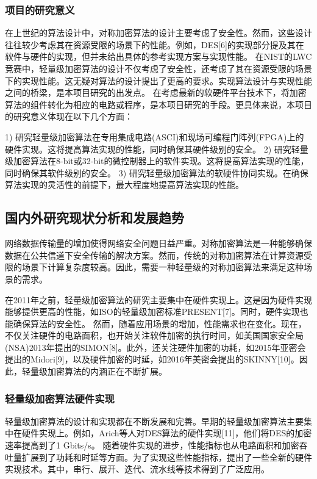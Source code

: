 \documentclass{ctexart}
\begin{document}
\subsubsection{项目的研究意义}
在上世纪的算法设计中，对称加密算法的设计主要考虑了安全性。然而，这些设计往往较少考虑其在资源受限的场景下的性能。例如，DES[6]的实现部分提及其在软件与硬件的实现，但并未给出具体的参考实现方案与实现性能。
在NIST的LWC竞赛中，轻量级加密算法的设计不仅考虑了安全性，还考虑了其在资源受限的场景下的实现性能。这无疑对算法的设计提出了更高的要求。实现算法设计与实现性能之间的桥梁，是本项目研究的出发点。
在考虑最新的软硬件平台技术下，将加密算法的组件转化为相应的电路或程序，是本项目研究的手段。更具体来说，本项目的研究意义体现在以下几个方面：

1) 研究轻量级加密算法在专用集成电路(ASCI)和现场可编程门阵列(FPGA)上的硬件实现。这将提高算法实现的性能，同时确保其硬件级别的安全。
2) 研究轻量级加密算法在8-bit或32-bit的微控制器上的软件实现。这将提高算法实现的性能，同时确保其软件级别的安全。
3) 研究轻量级加密算法的软硬件协同实现。在确保算法实现的灵活性的前提下，最大程度地提高算法实现的性能。


\subsection{国内外研究现状分析和发展趋势}

网络数据传输量的增加使得网络安全问题日益严重。对称加密算法是一种能够确保数据在公共信道下安全传输的解决方案。然而，传统的对称加密算法在计算资源受限的场景下计算复杂度较高。因此，需要一种轻量级的对称加密算法来满足这种场景的需求。

在2011年之前，轻量级加密算法的研究主要集中在硬件实现上。这是因为硬件实现能够提供更高的性能，如ISO的轻量级加密标准PRESENT[7]。同时，硬件实现也能确保算法的安全性。
然而，随着应用场景的增加，性能需求也在变化。现在，不仅关注硬件的电路面积，也开始关注软件加密的执行时间，如美国国家安全局(NSA)2013年提出的SIMON[8]。此外，还关注硬件加密的功耗，如2015年亚密会提出的Midori[9]，以及硬件加密的时延，如2016年美密会提出的SKINNY[10]。因此，轻量级加密算法的内涵正在不断扩展。
\subsubsection{轻量级加密算法硬件实现}
轻量级加密算法的设计和实现都在不断发展和完善。早期的轻量级加密算法主要集中在硬件实现上。例如，Arich等人对DES算法的硬件实现[11]，他们将DES的加密速率提高到了1 Gbits/s。
随着硬件实现的进步，性能指标也从电路面积和加密吞吐量扩展到了功耗和时延等方面。为了实现这些性能指标，提出了一些全新的硬件实现技术。其中，串行、展开、迭代、流水线等技术得到了广泛应用。
\end{document}
